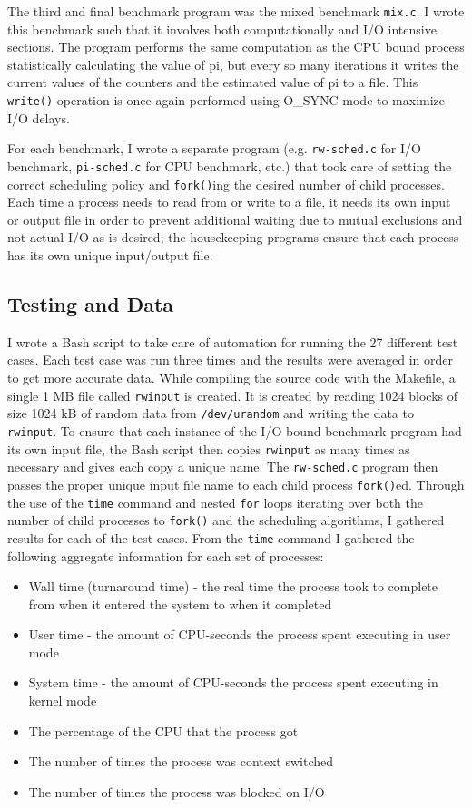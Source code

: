 The third and final benchmark program was the mixed benchmark \texttt{mix.c}.
I wrote this benchmark such that it involves both computationally and I/O intensive sections.  The program performs the same computation as the CPU bound process statistically calculating the value of pi, but every so many iterations it writes the current values of the counters and the estimated value of pi to a file.  This \texttt{write()} operation is once again performed using O\_SYNC mode to maximize I/O delays.

For each benchmark, I wrote a separate program (e.g. \texttt{rw-sched.c} for I/O benchmark, \texttt{pi-sched.c} for CPU benchmark\cite{sayler-pi-sched}, etc.) that took care of setting the correct scheduling policy and \texttt{fork()}ing the desired number of child processes.  Each time a process needs to read from or write to a file, it needs its own input or output file in order to prevent additional waiting due to mutual exclusions and not actual I/O as is desired; the housekeeping programs ensure that each process has its own unique input/output file.

\subsection{Testing and Data}

I wrote a Bash script to take care of automation for running the 27 different test cases.  Each test case was run three times and the results were averaged in order to get more accurate data.  While compiling the source code with the Makefile, a single 1 MB file called \texttt{rwinput} is created.  It is created by reading 1024 blocks of size 1024 kB of random data from \texttt{/dev/urandom} and writing the data to \texttt{rwinput}.  To ensure that each instance of the I/O bound benchmark program had its own input file, the Bash script then copies \texttt{rwinput} as many times as necessary and gives each copy a unique name.  The \texttt{rw-sched.c} program then passes the proper unique input file name to each child process \texttt{fork()}ed.  Through the use of the \texttt{time} command and nested \texttt{for} loops iterating over both the number of child processes to \texttt{fork()} and the scheduling algorithms, I gathered results for each of the test cases.  From the \texttt{time} command I gathered the following aggregate information for each set of processes:

\begin{itemize}
  \item Wall time (turnaround time) - the real time the process took to complete from when it entered the system to when it completed
  \item User time - the amount of CPU-seconds the process spent executing in user mode
  \item System time - the amount of CPU-seconds the process spent executing in kernel mode
  \item The percentage of the CPU that the process got
  \item The number of times the process was context switched
  \item The number of times the process was blocked on I/O
\end{itemize}

